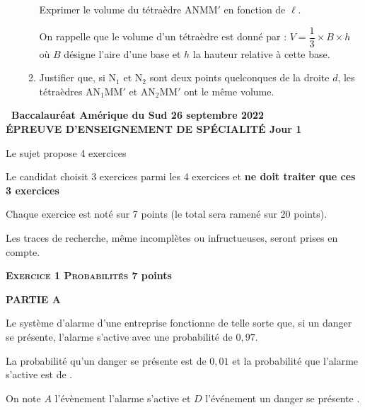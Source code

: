 \documentclass[10pt,a4paper]{article}
\begin{document}
\begin{enumerate}[resume]
\begin{enumerate}
Exprimer le volume du  tétraèdre ANMM$'$ en fonction de $\ell$.

On rappelle que le volume d'un tétraèdre est donné par : $V = \dfrac13 \times B \times h$ où $B$ désigne l'aire d'une base et $h$ la hauteur relative à cette base.
		\item Justifier que, si N$_1$ et N$_2$ sont deux points quelconques de la droite $d$, les tétraèdres AN$_1$MM$'$ et AN$_2$MM$'$ ont le même volume.
	\end{enumerate}
\end{enumerate}
\newpage
\hypertarget{AmeriSud1}{}

\label{AmeriSud1}

\pagestyle{fancy}
\thispagestyle{empty}

\begin{center}{\Large\textbf{\decofourleft~Baccalauréat Amérique du Sud 26 septembre 2022~\decofourright\\[6pt] ÉPREUVE D'ENSEIGNEMENT DE SPÉCIALITÉ Jour 1}}
\end{center}

\vspace{0,25cm}

Le sujet propose 4 exercices

Le candidat choisit 3 exercices parmi les 4 exercices et \textbf{ne doit traiter que ces 3 exercices}

\medskip

Chaque exercice est noté sur 7 points (le total sera ramené sur 20 points).

Les traces de recherche, même incomplètes ou infructueuses, seront prises en compte.

\bigskip

\textbf{\textsc{Exercice 1 Probabilités} \hfill 7 points}

\medskip

\textbf{PARTIE A}

\medskip

Le système d'alarme d'une entreprise fonctionne de telle sorte que, si un danger se présente, l'alarme s'active avec une probabilité de $0,97$. 

La probabilité qu'un danger se présente est de $0,01$ et la probabilité que l'alarme s'active est de .

On note $A$ l'évènement \og  l'alarme s'active \fg{}  et $D$ l'événement \og  un danger se présente \fg . 
\end{document}
